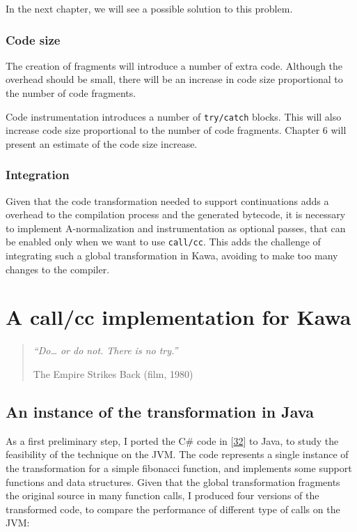 \documentclass[12pt,a4paper,oneside,openright]{book}
\begin{document}
In the next chapter, we will see a possible solution to this problem.

\subsection{Code size}\label{code-size}

The creation of fragments will introduce a number of extra code.
Although the overhead should be small, there will be an increase in code
size proportional to the number of code fragments.

Code instrumentation introduces a number of \texttt{try/catch} blocks.
This will also increase code size proportional to the number of code
fragments. Chapter 6 will present an estimate of the code size increase.

\subsection{Integration}\label{integration}

Given that the code transformation needed to support continuations adds
a overhead to the compilation process and the generated bytecode, it is
necessary to implement A-normalization and instrumentation as optional
passes, that can be enabled only when we want to use \texttt{call/cc}.
This adds the challenge of integrating such a global transformation in
Kawa, avoiding to make too many changes to the compiler.

\chapter{A call/cc implementation for
Kawa}\label{a-callcc-implementation-for-kawa}

\begin{quote}
\emph{``Do\ldots{} or do not. There is no try.''}

\begin{flushright}
The Empire Strikes Back (film, 1980)
\end{flushright}
\end{quote}

\section{An instance of the transformation in
Java}\label{an-instance-of-the-transformation-in-java}

As a first preliminary step, I ported the C\# code in
{[}\hyperref[ref-StackHack2005]{32}{]} to Java, to study the feasibility
of the technique on the JVM. The code represents a single instance of
the transformation for a simple fibonacci function, and implements some
support functions and data structures. Given that the global
transformation fragments the original source in many function calls, I
produced four versions of the transformed code, to compare the
performance of different type of calls on the JVM:
\end{document}
